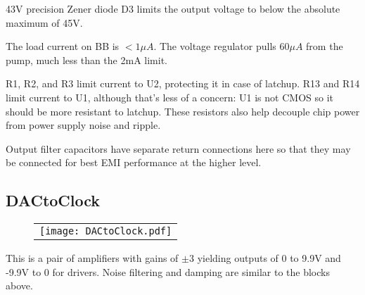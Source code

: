 \documentclass[a4paper,12pt]{article}
\begin{document}
43V precision Zener diode D3 limits the output voltage to below the absolute maximum of 45V.

The load current on BB is $<1\mu A$. The voltage regulator pulls $60\mu A$ from the pump, much less than the 2mA limit.

R1, R2, and R3 limit current to U2, protecting it in case of latchup. R13 and R14 limit current to U1, although that's less of a concern: U1 is not CMOS so it should be more resistant to latchup. These resistors also help decouple chip power from power supply noise and ripple.

Output filter capacitors have separate return connections here so that they may be connected for best EMI performance at the higher level.

%
\subsection{DACtoClock}

   \begin{figure}
   \begin{center}
   \begin{tabular}{c}
   \texttt{[image: DACtoClock.pdf]}
   \end{tabular}
   \end{center}
   \end{figure}


This is a pair of amplifiers with gains of $\pm3$ yielding outputs of 0 to 9.9V and -9.9V to 0 for drivers. Noise filtering and damping are similar to the blocks above.
\end{document}
